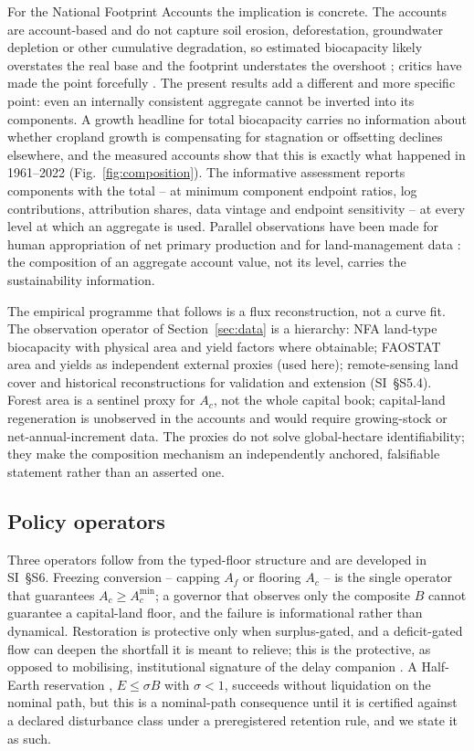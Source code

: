 \documentclass[preprint,12pt,authoryear]{elsarticle}
\newcommand{\Acmin}{A_c^{\min}}
\begin{document}
For the National Footprint Accounts the implication is concrete. The accounts are account-based and do not capture soil erosion, deforestation, groundwater depletion or other cumulative degradation, so estimated biocapacity likely overstates the real base and the footprint understates the overshoot \citep{Wackernagel2002,Borucke2013}; critics have made the point forcefully \citep{Blomqvist2013,GiampietroSaltelli2014,Galli2016,vdBerghGrazi2015}. The present results add a different and more specific point: even an internally consistent aggregate cannot be inverted into its components. A growth headline for total biocapacity carries no information about whether cropland growth is compensating for stagnation or offsetting declines elsewhere, and the measured accounts show that this is exactly what happened in 1961--2022 (Fig.~\ref{fig:composition}). The informative assessment reports components with the total -- at minimum component endpoint ratios, log contributions, attribution shares, data vintage and endpoint sensitivity -- at every level at which an aggregate is used. Parallel observations have been made for human appropriation of net primary production and for land-management data \citep{Haberl2007,Krausmann2013,Erb2017,Carvalhais2014}: the composition of an aggregate account value, not its level, carries the sustainability information.

The empirical programme that follows is a flux reconstruction, not a curve fit. The observation operator of Section~\ref{sec:data} is a hierarchy: NFA land-type biocapacity with physical area and yield factors where obtainable; FAOSTAT area and yields as independent external proxies (used here); remote-sensing land cover and historical reconstructions for validation and extension (SI~\S S5.4). Forest area is a sentinel proxy for $A_c$, not the whole capital book; capital-land regeneration is unobserved in the accounts and would require growing-stock or net-annual-increment data. The proxies do not solve global-hectare identifiability; they make the composition mechanism an independently anchored, falsifiable statement rather than an asserted one.

\subsection{Policy operators}

Three operators follow from the typed-floor structure and are developed in SI~\S S6. Freezing conversion -- capping $A_f$ or flooring $A_c$ -- is the single operator that guarantees $A_c\ge\Acmin$; a governor that observes only the composite $B$ cannot guarantee a capital-land floor, and the failure is informational rather than dynamical. Restoration is protective only when surplus-gated, and a deficit-gated flow can deepen the shortfall it is meant to relieve; this is the protective, as opposed to mobilising, institutional signature of the delay companion \citep{Abaee2026a}. A Half-Earth reservation \citep{Wilson2016}, $E\le\sigma B$ with $\sigma<1$, succeeds without liquidation on the nominal path, but this is a nominal-path consequence until it is certified against a declared disturbance class under a preregistered retention rule, and we state it as such.
\end{document}
